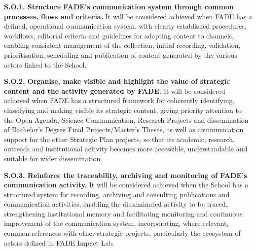 \documentclass[11pt,a4paper]{scrreprt}
\begin{document}
\textbf{S.O.1. Structure FADE's communication system through common processes, flows and criteria.} It will be considered achieved when FADE has a defined, operational communication system, with clearly established procedures, workflows, editorial criteria and guidelines for adapting content to channels, enabling consistent management of the collection, initial recording, validation, prioritisation, scheduling and publication of content generated by the various actors linked to the School.

\textbf{S.O.2. Organise, make visible and highlight the value of strategic content and the activity generated by FADE.} It will be considered achieved when FADE has a structured framework for coherently identifying, classifying and making visible its strategic content, giving priority attention to the Open Agenda, Science Communication, Research Projects and dissemination of Bachelor's Degree Final Projects/Master's Theses, as well as communication support for the other Strategic Plan projects, so that its academic, research, outreach and institutional activity becomes more accessible, understandable and suitable for wider dissemination.

\textbf{S.O.3. Reinforce the traceability, archiving and monitoring of FADE's communication activity.} It will be considered achieved when the School has a structured system for recording, archiving and consulting publications and communication activities, enabling the disseminated activity to be traced, strengthening institutional memory and facilitating monitoring and continuous improvement of the communication system, incorporating, where relevant, common references with other strategic projects, particularly the ecosystem of actors defined in FADE Impact Lab.
\end{document}
